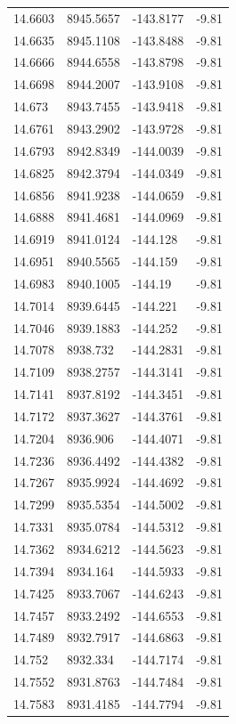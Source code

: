 \begin{table}[H]
\begin{tabular}{llll}
14.6603 & 8945.5657 & -143.8177 & -9.81 \\
14.6635 & 8945.1108 & -143.8488 & -9.81 \\
14.6666 & 8944.6558 & -143.8798 & -9.81 \\
14.6698 & 8944.2007 & -143.9108 & -9.81 \\
14.673 & 8943.7455 & -143.9418 & -9.81 \\
14.6761 & 8943.2902 & -143.9728 & -9.81 \\
14.6793 & 8942.8349 & -144.0039 & -9.81 \\
14.6825 & 8942.3794 & -144.0349 & -9.81 \\
14.6856 & 8941.9238 & -144.0659 & -9.81 \\
14.6888 & 8941.4681 & -144.0969 & -9.81 \\
14.6919 & 8941.0124 & -144.128 & -9.81 \\
14.6951 & 8940.5565 & -144.159 & -9.81 \\
14.6983 & 8940.1005 & -144.19 & -9.81 \\
14.7014 & 8939.6445 & -144.221 & -9.81 \\
14.7046 & 8939.1883 & -144.252 & -9.81 \\
14.7078 & 8938.732 & -144.2831 & -9.81 \\
14.7109 & 8938.2757 & -144.3141 & -9.81 \\
14.7141 & 8937.8192 & -144.3451 & -9.81 \\
14.7172 & 8937.3627 & -144.3761 & -9.81 \\
14.7204 & 8936.906 & -144.4071 & -9.81 \\
14.7236 & 8936.4492 & -144.4382 & -9.81 \\
14.7267 & 8935.9924 & -144.4692 & -9.81 \\
14.7299 & 8935.5354 & -144.5002 & -9.81 \\
14.7331 & 8935.0784 & -144.5312 & -9.81 \\
14.7362 & 8934.6212 & -144.5623 & -9.81 \\
14.7394 & 8934.164 & -144.5933 & -9.81 \\
14.7425 & 8933.7067 & -144.6243 & -9.81 \\
14.7457 & 8933.2492 & -144.6553 & -9.81 \\
14.7489 & 8932.7917 & -144.6863 & -9.81 \\
14.752 & 8932.334 & -144.7174 & -9.81 \\
14.7552 & 8931.8763 & -144.7484 & -9.81 \\
14.7583 & 8931.4185 & -144.7794 & -9.81 \\

\end{tabular}
\end{table}
